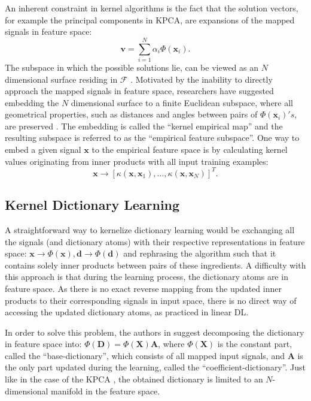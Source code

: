 \documentclass[journal]{IEEEtran}
\newcommand{\bD}{\mathbf{D}}
\newcommand{\bd}{\mathbf{d}}
\newcommand{\bx}{\mathbf{x}}
\newcommand{\bv}{\mathbf{v}}
\newcommand{\bX}{\mathbf{X}}
\newcommand{\cF}{\mathcal{F}}
\newcommand{\bA}{\mathbf{A}}
\begin{document}
An inherent constraint in kernel algorithms is the fact that the solution vectors, for example the principal components in KPCA, are expansions of the mapped signals in feature space:
\begin{equation}\label{eq:KPCA}
\bv = \sum_{i=1}^{N} \alpha_i\Phi(\bx_i).
\end{equation}
The subspace in which the possible solutions lie, can be viewed as an $N$ dimensional surface residing in $\cF$ \cite{InputFeature}. Motivated by the inability to directly approach the mapped signals in feature space, researchers have suggested embedding the $N$ dimensional surface to a finite Euclidean subspace, where all geometrical properties, such as distances and angles between pairs of $\Phi(\bx_i)'s$, are preserved \cite{Embedding}. The embedding is called the ``kernel empirical map'' and the resulting subspace is referred to as the ``empirical feature subspace''. One way to embed a given signal $\bx$ to the empirical feature space is by calculating kernel values originating from inner products with all input training examples:
\begin{equation}\label{eq:EmpiricalMap}
\bx \rightarrow \left[\kappa(\bx,\bx_1),\ldots,\kappa(\bx,\bx_N)\right]^T.
\end{equation}

\subsection{Kernel Dictionary Learning} \label{SS:KDL}

A straightforward way to kernelize dictionary learning would be exchanging all the signals (and dictionary atoms) with their respective representations in feature space: $\bx \rightarrow \Phi(\bx), \bd \rightarrow \Phi(\bd)$ and rephrasing the algorithm such that it contains solely inner products between pairs of these ingredients. A difficulty with this approach is that during the learning process, the dictionary atoms are in feature space. As there is no exact reverse mapping from the updated inner products to their corresponding signals in input space, there is no direct way of accessing the updated dictionary atoms, as practiced in linear DL.

In order to solve this problem, the authors in \cite{KDL} suggest decomposing the dictionary in feature space into: $\Phi(\bD) = \Phi(\bX) \bA$, where $\Phi(\bX)$ is the constant part, called the ``base-dictionary'', which consists of all mapped input signals, and $\bA$ is the only part updated during the learning, called the ``coefficient-dictionary''. Just like in the case of the KPCA \cite{KPCA}, the obtained  dictionary is limited to an $N$-dimensional manifold in the feature space.
\end{document}
